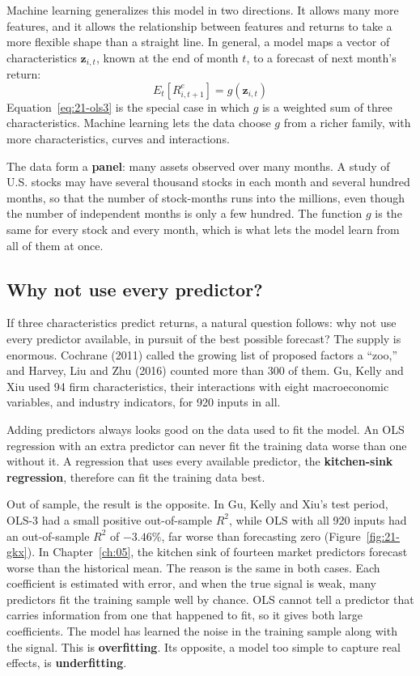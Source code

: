 Machine learning generalizes this model in two directions. It allows many more features, and it allows the relationship between features and returns to take a more flexible shape than a straight line. In general, a model maps a vector of characteristics $\mathbf{z}_{i,t}$, known at the end of month $t$, to a forecast of next month's return:
\begin{equation}
  E_t[R^{e}_{i,t+1}] = g(\mathbf{z}_{i,t})
  \label{eq:21-g}
\end{equation}
Equation~\eqref{eq:21-ols3} is the special case in which $g$ is a weighted sum of three characteristics. Machine learning lets the data choose $g$ from a richer family, with more characteristics, curves and interactions.

The data form a \textbf{panel}: many assets observed over many months. A study of U.S. stocks may have several thousand stocks in each month and several hundred months, so that the number of stock-months runs into the millions, even though the number of independent months is only a few hundred. The function $g$ is the same for every stock and every month, which is what lets the model learn from all of them at once.

\subsection{Why not use every predictor?}
\label{sec:21-why}

If three characteristics predict returns, a natural question follows: why not use every predictor available, in pursuit of the best possible forecast? The supply is enormous. 
Cochrane (2011) called the growing list of proposed factors a ``zoo,'' and Harvey, Liu and Zhu (2016) counted more than 300 of them.
Gu, Kelly and Xiu used 94 firm characteristics, their interactions with eight macroeconomic variables, and industry indicators, for 920 inputs in all.

Adding predictors always looks good on the data used to fit the model. An OLS regression with an extra predictor can never fit the training data worse than one without it. A regression that uses every available predictor, the \textbf{kitchen-sink regression}, therefore can fit the training data best.

Out of sample, the result is the opposite. In Gu, Kelly and Xiu's test period, OLS-3 had a small positive out-of-sample $R^2$, while OLS with all 920 inputs had an out-of-sample $R^2$ of $-3.46\%$, far worse than forecasting zero (Figure~\ref{fig:21-gkx}). In Chapter~\ref{ch:05}, the kitchen sink of fourteen market predictors forecast worse than the historical mean. The reason is the same in both cases. Each coefficient is estimated with error, and when the true signal is weak, many predictors fit the training sample well by chance. OLS cannot tell a predictor that carries information from one that happened to fit, so it gives both large coefficients. The model has learned the noise in the training sample along with the signal. This is \textbf{overfitting}. Its opposite, a model too simple to capture real effects, is \textbf{underfitting}.

